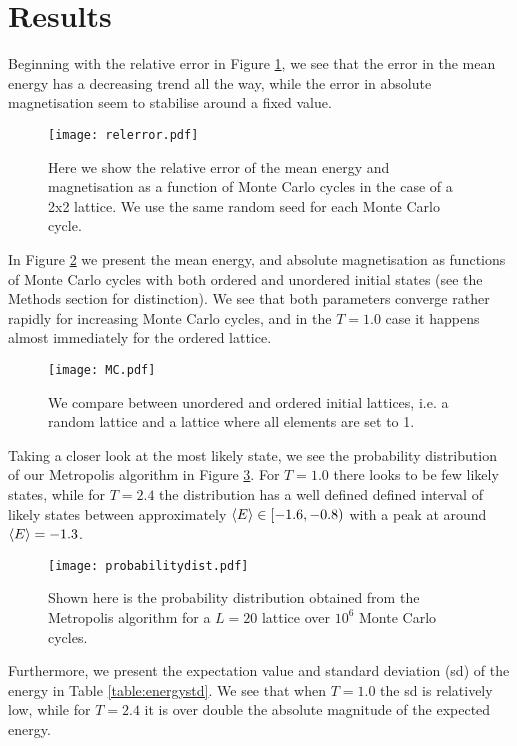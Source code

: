 \section{Results}
\label{sec:results}

Beginning with the relative error in Figure \ref{fig:compare}, we see that the error in the mean energy has a decreasing trend all the way, while the error in absolute magnetisation seem to stabilise around a fixed value.
\begin{figure}[htbp]
	\centering
	\texttt{[image: relerror.pdf]}
	\caption{Here we show the relative error of the mean energy and magnetisation as a function of Monte Carlo cycles in the case of a 2x2 lattice. We use the same random seed for each Monte Carlo cycle.}
	\label{fig:compare}
\end{figure}

In Figure \ref{fig:MC} we present the mean energy, and absolute magnetisation as functions of Monte Carlo cycles with both ordered and unordered initial states (see the Methods section for distinction). We see that both parameters converge rather rapidly for increasing Monte Carlo cycles, and in the $T=1.0$ case it happens almost immediately for the ordered lattice.
\begin{figure}[htbp]
	\centering
	\texttt{[image: MC.pdf]}
	\caption{We compare between unordered and ordered initial lattices, i.e. a random lattice and a lattice where all elements are set to 1.}
	\label{fig:MC}
\end{figure}

Taking a closer look at the most likely state, we see the probability distribution of our Metropolis algorithm in Figure \ref{fig:probabilitydist}. For $T=1.0$ there looks to be few likely states, while for $T=2.4$ the distribution has a well defined defined interval of likely states between approximately $\expval{E} \in [-1.6, -0.8)$ with a peak at around $\expval{E} = -1.3$.
\begin{figure}[htbp]
	\centering
	\texttt{[image: probabilitydist.pdf]}
	\caption{Shown here is the probability distribution obtained from the Metropolis algorithm for a $L=20$ lattice over $10^6$ Monte Carlo cycles.}
	\label{fig:probabilitydist}
\end{figure}

Furthermore, we present the expectation value and standard deviation (sd) of the energy in Table \ref{table:energystd}. We see that when $T=1.0$ the sd is relatively low, while for $T=2.4$ it is over double the absolute magnitude of the expected energy.

